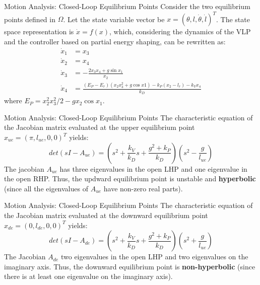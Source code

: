\documentclass[10pt]{beamer}
\begin{document}
  \begin{frame}{Motion Analysis: Closed-Loop Equilibrium Points}
    Consider the two equilibrium points defined in $\Omega$.
    Let the state variable vector be $x = (\theta, l, \dot{\theta},
    \dot{l})^T$. The state space representation is $\dot{x} = f(x)$,
    which, considering the dynamics of the VLP and the controller based on
    partial energy shaping, can be rewritten as: 
    \begin{align*}
      \dot{x}_1 &= x_3 \\
      \dot{x}_2 &= x_4 \\
      \dot{x}_3 &= -\frac{2 x_3 x_4 + g\sin x_1}{x_2} \\
      \dot{x}_4 &= \frac{(E_P-E_r)(x_2 x_3^2 + g\cos x1)
        -k_P(x_2-l_r)-k_V x_4}{k_D}
    \end{align*}
    where $E_P=x_2^2 x_3^2 / 2 - g x_2 \cos x_1$.
  \end{frame}

  \begin{frame}{Motion Analysis: Closed-Loop Equilibrium Points}
    The characteristic equation of the Jacobian matrix evaluated
    at the upper equilibrium point $x_{ue} = (\pi, l_{ue}, 0, 0)^T$
    yields:
    \begin{equation*}
      det(sI-A_{ue}) = \left( s^2 + \frac{k_V}{k_D}s +
        \frac{g^2+k_P}{k_D} \right) \left( s^2 - \frac{g}{l_{ue}}\right)
    \end{equation*}
    The jacobian $A_{ue}$ has three eigenvalues in the open LHP and
    one eigenvalue in the open RHP. Thus, the updward equilibrium point
    is unstable and \textbf{hyperbolic} (since all the eigenvalues of $A_{ue}$
    have non-zero real parts).
  \end{frame}

  \begin{frame}{Motion Analysis: Closed-Loop Equilibrium Points}
    The characteristic equation of the Jacobian matrix evaluated
    at the downward equilibrium point $x_{de} = (0, l_{de}, 0, 0)^T$ yields:
    \begin{equation*}
      det(sI-A_{de}) = \left( s^2 + \frac{k_V}{k_D}s +
        \frac{g^2+k_P}{k_D} \right) \left( s^2 + \frac{g}{l_{ue}}\right)
    \end{equation*}
    The Jacobian $A_{de}$ two eigenvalues in the open LHP and two
    eigenvalues on the imaginary axis. Thus, the downward equilibrium
    point is \textbf{non-hyperbolic} (since there
    is at least one eigenvalue on the imaginary axis).
  \end{frame}
\end{document}
